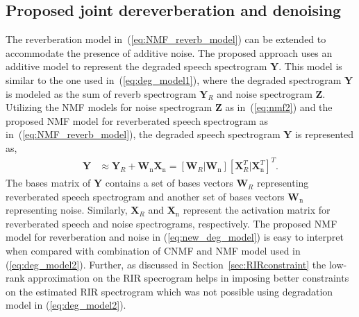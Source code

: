 \subsection{Proposed joint dereverberation and denoising}
\label{sec:ProposedJointModel}
The reverberation model in~(\ref{eq:NMF_reverb_model}) can be extended to accommodate the presence of additive noise. 
The proposed approach uses an additive model to represent the degraded speech spectrogram $\mathbf{Y}$. This model is similar to the one used in~(\ref{eq:deg_model1}), where the degraded spectrogram $\mathbf{Y}$ is modeled as the sum of reverb spectrogram $\mathbf{Y}_R$ and noise spectrogram $\mathbf{Z}$. Utilizing the NMF models for noise spectrogram $\mathbf{Z}$ as in~(\ref{eq:nmf2}) and the proposed NMF model for reverberated speech spectrogram as in~(\ref{eq:NMF_reverb_model}), the degraded speech spectrogram $\mathbf{Y}$ is represented as,
\begin{align}
\mathbf{Y} & \approx \mathbf{Y}_R + \mathbf{W}_{\text{n}}\mathbf{X}_{\text{n}} = [\mathbf{W}_R| \mathbf{W}_{\text{n}}][\mathbf{X}_R^T | \mathbf{X}_{\text{n}}^T]^T. 
\label{eq:new_deg_model}
\end{align}
The bases matrix  of $\mathbf{Y}$ contains a set of bases vectors $\mathbf{W}_R$ representing reverberated speech spectrogram and another set of bases vectors $\mathbf{W}_{\text{n}}$ representing noise. Similarly, $\mathbf{X}_R$ and $\mathbf{X}_{\text{n}}$ represent the activation matrix for reverberated speech and noise spectrograms, respectively. The proposed NMF model for reverberation and noise in (\ref{eq:new_deg_model}) is easy to interpret when compared with combination of CNMF and NMF model used in (\ref{eq:deg_model2}). Further, as discussed in Section~\ref{sec:RIRconstraint} the low-rank approximation on the RIR specrogram helps in imposing better constraints on the estimated RIR spectrogram which was not possible using degradation model in (\ref{eq:deg_model2}).

